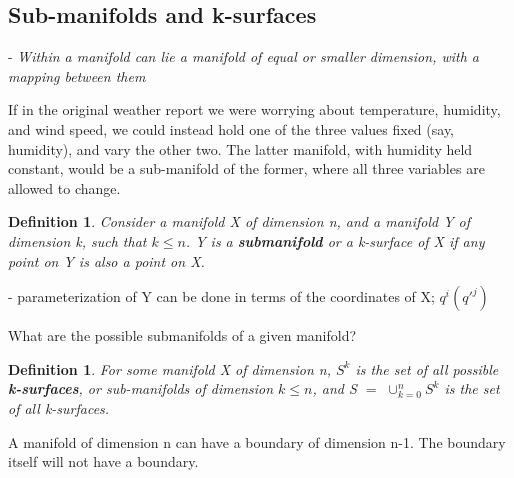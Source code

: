 \documentclass{book}
\newtheorem{defn}[equation]{Definition}
\begin{document}
\subsection{Sub-manifolds and k-surfaces}

- \emph{Within a manifold can lie a manifold of equal or smaller dimension, with a mapping between them}

If in the original weather report we were worrying about temperature, humidity, and wind speed, we could instead hold one of the three values fixed (say, humidity), and vary the other two. The latter manifold, with humidity held constant, would be a sub-manifold of the former, where all three variables are allowed to change.  



\begin{defn}
	Consider a manifold X of dimension n, and a manifold Y of dimension k, such that $k \leq n$. Y is a \textbf{submanifold} or a k-surface of X if any point on Y is also a point on X. 
\end{defn}

- parameterization of Y can be done in terms of the coordinates of X; $q^i(q'^j)$




What are the possible submanifolds of a given manifold?


\begin{defn}
	For some manifold X of dimension n, $S^k$ is the set of all possible \textbf{k-surfaces}, or sub-manifolds of dimension $k \leq n$, and S $=$ $\cup^n_{k=0}S^k$ is the set of all k-surfaces. 
\end{defn}

A manifold of dimension n can have a boundary of dimension n-1. The boundary itself will not have a boundary.
\end{document}

